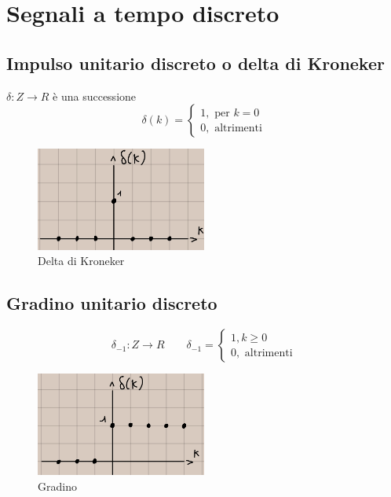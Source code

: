 \documentclass[a4paper, 12pt]{book}
\theoremstyle{plain}
\begin{document}
\section{Segnali a tempo discreto}

\subsection{Impulso unitario discreto o delta di Kroneker}

$\delta: Z \rightarrow R$ è una successione
\[\delta(k) = 
    \begin{cases}
        1, \textrm{ per } k = 0\\
        0, \textrm{ altrimenti}
    \end{cases}  
\]

\begin{figure}
    \includegraphics[width=0.5\textwidth]{kroneker.jpg}
    \caption{Delta di Kroneker}
\end{figure}

\subsection{Gradino unitario discreto}

\[
    \delta_{-1}: Z \rightarrow R\qquad \delta_{-1} = \begin{cases}
        1, k \ge 0\\
        0, \textrm{ altrimenti}
    \end{cases}
\]

\begin{figure}
    \includegraphics[width=0.5\textwidth]{gradino2.jpg}
    \caption{Gradino}
\end{figure}
\end{document}
